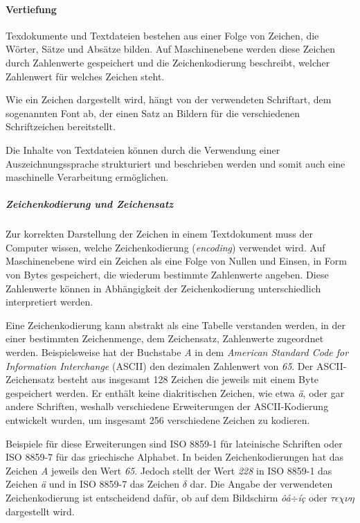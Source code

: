\paragraph{Vertiefung}
Texdokumente und Textdateien bestehen aus einer Folge von Zeichen, die Wörter, Sätze und Absätze bilden. Auf Maschinenebene werden diese Zeichen durch Zahlenwerte gespeichert und die Zeichenkodierung beschreibt, welcher Zahlenwert für welches Zeichen steht. 

Wie ein Zeichen dargestellt wird, hängt von der verwendeten Schriftart, dem sogenannten Font ab, der einen Satz an Bildern für die verschiedenen Schriftzeichen bereitstellt.

Die Inhalte von Textdateien können durch die Verwendung einer Auszeichnungssprache strukturiert und beschrieben werden und somit auch eine maschinelle Verarbeitung ermöglichen.

\subparagraph{Zeichenkodierung und Zeichensatz} 
Zur korrekten Darstellung der Zeichen in einem Textdokument muss der Computer wissen, welche Zeichenkodierung (\emph{encoding}) verwendet wird. Auf Maschinenebene wird ein Zeichen als eine Folge von Nullen und Einsen, in Form von Bytes gespeichert, die wiederum bestimmte Zahlenwerte angeben. Diese Zahlenwerte können in Abhängigkeit der Zeichenkodierung unterschiedlich interpretiert werden.

Eine Zeichenkodierung kann abstrakt als eine Tabelle verstanden werden, in der einer bestimmten Zeichenmenge, dem Zeichensatz, Zahlenwerte zugeordnet werden. Beispielsweise hat der Buchstabe \emph{A} in dem \emph{American Standard Code for Information Interchange} (ASCII) den dezimalen Zahlenwert von \emph{65}. Der ASCII-Zeichensatz besteht aus insgesamt 128 Zeichen die jeweils mit einem Byte gespeichert werden. Er enthält keine diakritischen Zeichen, wie etwa \emph{ä}, oder gar andere Schriften, weshalb verschiedene Erweiterungen der ASCII-Kodierung entwickelt wurden, um insgesamt 256 verschiedene Zeichen zu kodieren. 

Beispiele für diese Erweiterungen sind ISO 8859-1 für lateinische Schriften oder ISO 8859-7 für das griechische Alphabet. In beiden Zeichenkodierungen hat das Zeichen \emph{A} jeweils den Wert \emph{65}. Jedoch stellt der Wert \emph{228} in ISO 8859-1 das Zeichen \emph{ä} und in ISO 8859-7 das Zeichen \emph{$\delta$} dar. Die Angabe der verwendeten Zeichenkodierung ist entscheidend dafür, ob auf dem Bildschirm \emph{ôå$\div$íç} oder \emph{$\tau\epsilon\chi\nu\eta$} dargestellt wird. %

